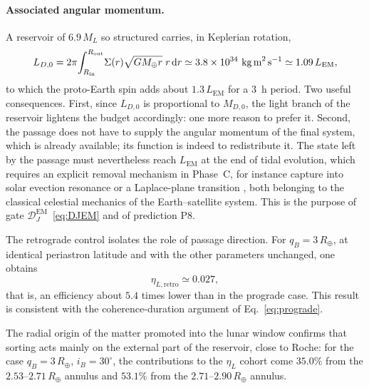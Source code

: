 \documentclass[11pt,a4paper,openany]{report}
\newcommand{\Mt}{M_{\oplus}}
\newcommand{\Rt}{R_{\oplus}}
\newcommand{\dd}{\mathrm{d}}
\begin{document}
\paragraph{Associated angular momentum.}
A reservoir of $6.9\,M_L$ so structured carries, in Keplerian rotation,
\begin{equation}
L_{D,0}=2\pi\!\int_{R_{\mathrm{in}}}^{R_{\mathrm{out}}}\!\Sigma(r)\sqrt{G\Mt r}\;r\,\dd r
\simeq3.8\times10^{34}\ \text{kg\,m}^2\,\text{s}^{-1}\simeq1.09\,L_{\mathrm{EM}},
\label{eq:LD-reservoir}
\end{equation}
to which the proto-Earth spin adds about $1.3\,L_{\mathrm{EM}}$ for a $3$~h period. Two useful
consequences. First, since $L_{D,0}$ is proportional to $M_{D,0}$, the light branch of the
reservoir lightens the budget accordingly: one more reason to prefer it. Second, the passage does
not have to supply the angular momentum of the final system, which is already available; its
function is indeed to redistribute it. The state left by the passage must nevertheless reach
$L_{\mathrm{EM}}$ at the end of tidal evolution, which requires an explicit removal mechanism in
Phase~C, for instance capture into solar evection resonance or a Laplace-plane transition
\cite{MurrayDermott1999,TremaineTouma2009}, both belonging to the classical celestial mechanics of
the Earth--satellite system. This is the purpose of gate
$\mathcal{D}_J^{\mathrm{EM}}$~\eqref{eq:DJEM} and of prediction P8.

The retrograde control isolates the role of passage direction. For $q_B=3\,\Rt$, at identical
periastron latitude and with the other parameters unchanged, one obtains
\begin{equation}
\eta_{L,\mathrm{retro}}\simeq0.027,
\label{eq:retro-pilot}
\end{equation}
that is, an efficiency about $5.4$ times lower than in the prograde case. This result is consistent
with the coherence-duration argument of Eq.~\eqref{eq:prograde}.

The radial origin of the matter promoted into the lunar window confirms that sorting acts mainly
on the external part of the reservoir, close to Roche: for the case $q_B=3\,\Rt$, $i_B=30^\circ$,
the contributions to the $\eta_L$ cohort come $35.0\%$ from the $2.53$--$2.71\,\Rt$ annulus and
$53.1\%$ from the $2.71$--$2.90\,\Rt$ annulus.
\end{document}
